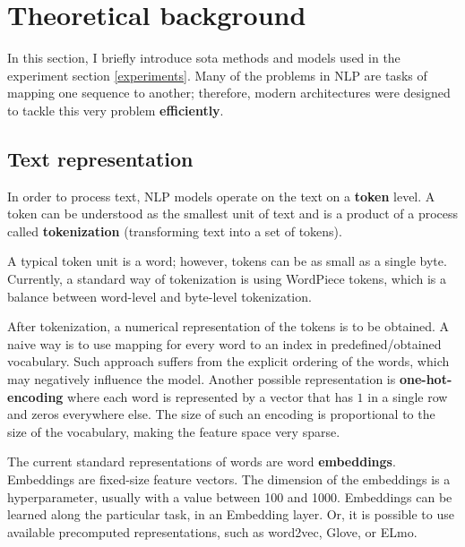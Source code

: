 \chapter{Theoretical background}\label{theory}
In this section, I briefly introduce \gls{sota} methods and models used in the experiment section \ref{experiments}. Many of the problems in NLP are tasks of mapping one sequence to another; therefore, modern architectures were designed to tackle this very problem \textbf{efficiently}.




\section{Text representation}
In order to process text, NLP models operate on the text on a \textbf{token} level. A token can be understood as the smallest unit of text and is a product of a process called \textbf{tokenization} (transforming text into a set of tokens).

A typical token unit is a word; however, tokens can be as small as a single byte. Currently, a standard way of tokenization is using WordPiece tokens, which is a balance between word-level and byte-level tokenization.

After tokenization, a numerical representation of the tokens is to be obtained. A naive way is to use mapping for every word to an index in predefined/obtained vocabulary. Such approach suffers from the explicit ordering of the words, which may negatively influence the model. Another possible representation is \textbf{one-hot-encoding} where each word is represented by a vector that has $1$ in a single row and zeros everywhere else. The size of such an encoding is proportional to the size of the vocabulary, making the feature space very sparse. 

The current standard representations of words are word \textbf{embeddings}. Embeddings are fixed-size feature vectors. The dimension of the embeddings is a hyperparameter, usually with a value between 100 and 1000. Embeddings can be learned along the particular task, in an Embedding layer. Or, it is possible to use available precomputed representations, such as word2vec, Glove, or ELmo.
\newpage





